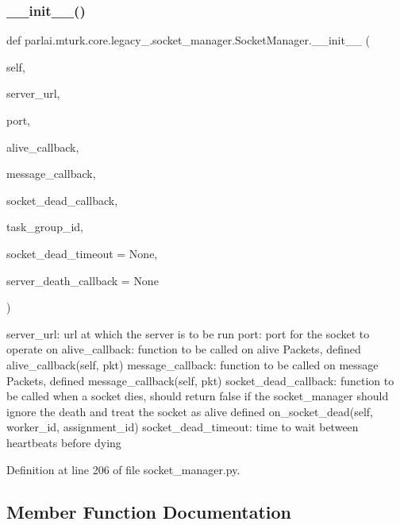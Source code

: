 \subsubsection{\texorpdfstring{\+\_\+\+\_\+init\+\_\+\+\_\+()}{\_\_init\_\_()}}
{\footnotesize\ttfamily def parlai.\+mturk.\+core.\+legacy\+\_.\+socket\+\_\+manager.\+Socket\+Manager.\+\_\+\+\_\+init\+\_\+\+\_\+ (\begin{DoxyParamCaption}\item[{}]{self,  }\item[{}]{server\+\_\+url,  }\item[{}]{port,  }\item[{}]{alive\+\_\+callback,  }\item[{}]{message\+\_\+callback,  }\item[{}]{socket\+\_\+dead\+\_\+callback,  }\item[{}]{task\+\_\+group\+\_\+id,  }\item[{}]{socket\+\_\+dead\+\_\+timeout = {\ttfamily None},  }\item[{}]{server\+\_\+death\+\_\+callback = {\ttfamily None} }\end{DoxyParamCaption})}

\begin{DoxyVerb}server_url:           url at which the server is to be run
port:                 port for the socket to operate on
alive_callback:       function to be called on alive Packets, defined
               alive_callback(self, pkt)
message_callback:     function to be called on message Packets, defined
               message_callback(self, pkt)
socket_dead_callback: function to be called when a socket dies, should
              return false if the socket_manager should ignore
              the death and treat the socket as alive defined
               on_socket_dead(self, worker_id, assignment_id)
socket_dead_timeout:  time to wait between heartbeats before dying
\end{DoxyVerb}
 

Definition at line 206 of file socket\+\_\+manager.\+py.



\subsection{Member Function Documentation}
\mbox{\label{classparlai_1_1mturk_1_1core_1_1legacy__2018_1_1socket__manager_1_1SocketManager_a762590d50448509a5986c27a60dfea1a}} 
